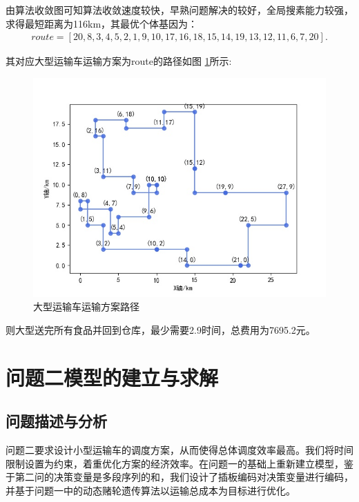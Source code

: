 \documentclass{whutmod}
\begin{document}
      
      
      由算法收敛图可知算法收敛速度较快，早熟问题解决的较好，全局搜素能力较强， 求得最短距离为116km，其最优个体基因为：
               \begin{gather*}
      route = [20,8,3,4,5,2,1,9,10,17,16,18,15,14,19,13,12,11,6,7,20].
      \end{gather*}

      
      其对应大型运输车运输方案为route的路径如图 \ref{llsssl}所示:
  
         \begin{figure}[H]
         	\centering
         	\includegraphics[width=\textwidth]{figures/11.jpg}
         	\caption{大型运输车运输方案路径}\label{llsssl}
         \end{figure}
     
     则大型送完所有食品并回到仓库，最少需要2.9时间，总费用为7695.2元。
     
 \section{问题二模型的建立与求解}
 
\subsection{问题描述与分析}
问题二要求设计小型运输车的调度方案，从而使得总体调度效率最高。我们将时间限制设置为约束，着重优化方案的经济效率。在问题一的基础上重新建立模型，鉴于第二问的决策变量是多段序列的和，我们设计了插板编码对决策变量进行编码，并基于问题一中的动态赌轮遗传算法以运输总成本为目标进行优化。
\end{document}
